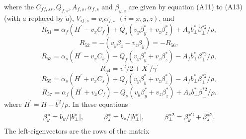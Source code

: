 where the $C_{ff,ss}, Q_{f,s}, A_{f,s}, \alpha_{f,s}$ and $\beta_{y,z}$ are
given by equation (A11) to (A13) (with $a$ replaced by $\tilde{a}$), 
$V_{if,s} = v_{i}\alpha_{f,s}$ $(i=x,y,z)$, and
\begin{equation}
R_{51} = \alpha_{f} \left( H^{\prime}- v_{x}C_{f} \right)
+Q_{s}(v_{y}\beta_{y}^{\ast} + v_{z}\beta_{z}^{\ast})
+A_{s}b_{\perp}^{\ast}\beta_{\perp}^{\ast 2}/\rho,
\end{equation}
\begin{equation}
R_{52} = -(v_{y}\beta_{z} - v_{z}\beta_{y}) = -R_{56},
\end{equation}
\begin{equation}
R_{53} = \alpha_{s} \left( H^{\prime} - v_{x}C_{s} \right)
-Q_{f}(v_{y}\beta_{y}^{\ast} + v_{z}\beta_{z}^{\ast})
-A_{f}b_{\perp}^{\ast}\beta_{\perp}^{\ast 2}/\rho,
\end{equation}
\begin{equation}
R_{54} = v^{2}/2 + X^{\prime}/\gamma^{\prime}
\end{equation}
\begin{equation}
R_{55} = \alpha_{s} \left( H^{\prime}+ v_{x}C_{s} \right)
+Q_{f}(v_{y}\beta_{y}^{\ast} + v_{z}\beta_{z}^{\ast})
-A_{f}b_{\perp}^{\ast}\beta_{\perp}^{\ast 2}/\rho,
\end{equation}
\begin{equation}
R_{57} = \alpha_{f} \left( H^{\prime} + v_{x}C_{f} \right)
-Q_{s}(v_{y}\beta_{y}^{\ast} + v_{z}\beta_{z}^{\ast})
+A_{s}b_{\perp}^{\ast}\beta_{\perp}^{\ast 2}/\rho.
\end{equation}
where $H^{\prime} = H-b^{2}/\rho$.  In these equations
\begin{equation}
\beta_{y}^{\ast} = b_{y}/|b_{\perp}^{\ast}|, \hspace*{1cm}
\beta_{z}^{\ast} = b_{z}/|b_{\perp}^{\ast}|, \hspace*{1cm}
\beta_{\perp}^{\ast 2} = \beta_{y}^{\ast 2} + \beta_{z}^{\ast 2}.
\end{equation}
The left-eigenvectors are the rows of the matrix
